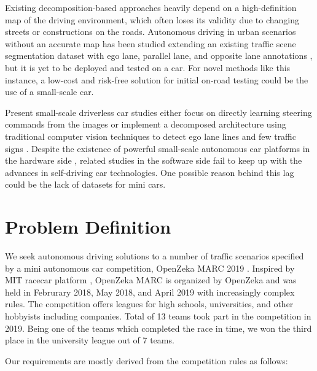 Existing decomposition-based approaches heavily depend on a high-definition map
of the driving environment, which often loses its validity due to changing
streets or constructions on the roads. Autonomous driving in urban scenarios
without an accurate map has been studied extending an existing traffic scene
segmentation dataset with ego lane, parallel lane, and opposite lane
annotations \cite{Meyer2018DeepSL}, but it is yet to be deployed and tested on
a car. For novel methods like this instance, a low-cost and risk-free solution
for initial on-road testing could be the use of a small-scale car.

Present small-scale driverless car studies either focus on directly learning
steering commands from the images \cite{Bechtel2017DeepPicarAL,
Do2018RealTimeSC} or implement a decomposed architecture using traditional
computer vision techniques to detect ego lane lines and few traffic signs
\cite{Blaga2018MiniatureAV}. Despite the existence of powerful small-scale
autonomous car platforms in the hardware side \cite{Karaman2017ProjectbasedCA},
related studies in the software side fail to keep up with the advances in
self-driving car technologies. One possible reason behind this lag could be the
lack of datasets for mini cars.


\section{Problem Definition}

We seek autonomous driving solutions to a number of traffic scenarios specified
by a mini autonomous car competition, OpenZeka MARC 2019 \cite{OpenZekaMARC}.
Inspired by MIT racecar platform \cite{Karaman2017ProjectbasedCA}, OpenZeka
MARC is organized by OpenZeka and was held in Februrary 2018, May 2018, and
April 2019 with increasingly complex rules. The competition offers leagues for
high schools, universities, and other hobbyists including companies. Total of
13 teams took part in the competition in 2019. Being one of the teams which
completed the race in time, we won the third place in the university league out
of 7 teams.

Our requirements are mostly derived from the competition rules as follows:

